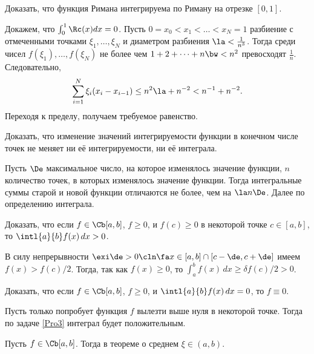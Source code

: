 \documentclass[a4paper]{article}
\begin{document}
\begin{problem}
Доказать, что функция Римана
интегрируема по Риману на отрезке $[0,1]$.
\end{problem}
\begin{solution}
Докажем, что $\int_0^1\Rc(x)dx=0$. Пусть $0=x_0<x_1<\ldots<x_N=1$
разбиение с отмеченными точками $\xi_1,\ldots,\xi_N$ и диаметром разбиения
$\la<\frac{1}{n^3}$. Тогда среди чисел $f(\xi_1),\ldots,f(\xi_N)$ не более
чем $1+2+\cdots+n\bw<n^2$ превосходят $\frac{1}{n}$. Следовательно,
$$\sum_{i=1}^N \xi_i (x_i- x_{i-1})\le n^2\la+n^{-2}<n^{-1}+n^{-2}.$$
Переходя к пределу, получаем требуемое равенство.
\end{solution}

\begin{problem}
Доказать, что изменение значений интегрируемости функции в конечном числе точек не меняет ни её интегрируемости, ни её
интеграла.
\end{problem}
\begin{solution}
Пусть $\De$  максимальное число, на которое изменялось значение функции,
$n$ количество точек, в которых изменялось значение функции. Тогда
интегральные суммы старой и новой функции отличаются не более, чем на
$\la n\De$. Далее по определению интеграла.
\end{solution}

\begin{problem}
\label{Pro3}Доказать, что если $f \in \Cb[a,b]$, $f \ge 0$, и $f(c) \ge 0$ в некоторой точке $c \in [a,b]$, то $\intl{a}{b}f(x)\,dx > 0$.
\end{problem}
\begin{solution}
В силу непрерывности $\exi \de > 0\cln \fa x\in [a,b] \cap [c-\de,c+\de]$ имеем $f(x) > f(c)/2$.
Тогда, так как $f(x)\ge 0$, то $\int_a^b f(x)\,dx\ge \delta f(c)/2>0$.
\end{solution}

\begin{problem}
Доказать, что если $f \in \Cb[a,b]$, $f \ge 0$, и $\intl{a}{b}f(x)\,dx = 0$, то $f \equiv 0$.
\end{problem}
\begin{solution}
Пусть только попробует функция $f$ вылезти выше нуля в некоторой точке. Тогда по задаче \ref{Pro3} интеграл будет
положительным.
\end{solution}

\begin{problem}
Пусть $f \in \Cb[a,b]$. Тогда в теореме о среднем $\xi \in (a,b)$.
\end{problem}
\end{document}
